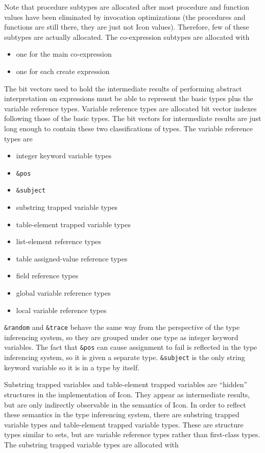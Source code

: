 Note that procedure subtypes are allocated after most procedure and
function values have been eliminated by invocation optimizations (the
procedures and functions are still there, they are just not Icon
values). Therefore, few of these subtypes are actually allocated. The
co-expression subtypes are allocated with

\liststyleLxxviii
\begin{itemize}
\item 
one for the main co-expression 
\item 
one for each create expression 
\end{itemize}

The bit vectors used to hold the intermediate results of performing
abstract interpretation on expressions must be able to represent the
basic types plus the variable reference types. Variable reference
types are allocated bit vector indexes following those of the basic
types. The bit vectors for intermediate results are just long enough
to contain these two classifications of types. The variable reference
types are

\liststyleLxxix
\begin{itemize}
\item 
integer keyword variable types 
\item 
\texttt{\&pos} 
\item 
\texttt{\&subject}
\item 
substring trapped variable types 
\item 
table-element trapped variable types 
\item 
list-element reference types 
\item 
table assigned-value reference types 
\item 
field reference types 
\item 
global variable reference types 
\item 
local variable reference types 
\end{itemize}

\texttt{\&random} and \texttt{\&trace} behave the same way from the
perspective of the type inferencing system, so they are grouped under
one type as integer keyword variables. The fact that \texttt{\&pos}
can cause assignment to fail is reflected in the type inferencing
system, so it is given a separate type. \texttt{\&subject} is the only
string keyword variable so it is in a type by itself.

Substring trapped variables and table-element trapped variables are
``hidden'' structures in the implementation of Icon. They appear as
intermediate results, but are only indirectly observable in the
semantics of Icon. In order to reflect these semantics in the type
inferencing system, there are substring trapped variable types and
table-element trapped variable types. These are structure types
similar to sets, but are variable reference types rather than
first-class types. The substring trapped variable types are allocated
with

